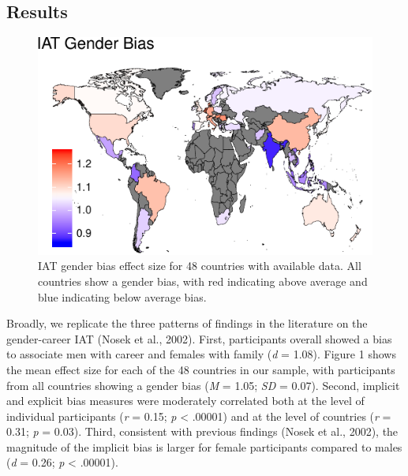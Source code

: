 \documentclass[10pt, letterpaper]{article}
\newenvironment{CodeChunk}{}{}
\begin{document}
\subsection{Results}\label{results}

\begin{CodeChunk}
\begin{figure}[t]

{\centering \includegraphics{figs/map-1} 

}

\caption[IAT gender bias effect size for 48 countries with available data]{IAT gender bias effect size for 48 countries with available data. All countries show a gender bias, with red indicating above average and blue indicating below average bias.}\label{fig:map}
\end{figure}
\end{CodeChunk}

Broadly, we replicate the three patterns of findings in the literature
on the gender-career IAT (Nosek et al., 2002). First, participants
overall showed a bias to associate men with career and females with
family (\emph{d} = 1.08). Figure 1 shows the mean effect size for each
of the 48 countries in our sample, with participants from all countries
showing a gender bias (\emph{M} = 1.05; \emph{SD} = 0.07). Second,
implicit and explicit bias measures were moderately correlated both at
the level of individual participants (\emph{r} = 0.15; \emph{p}
\textless{} .00001) and at the level of countries (\emph{r} = 0.31;
\emph{p} = 0.03). Third, consistent with previous findings (Nosek et
al., 2002), the magnitude of the implicit bias is larger for female
participants compared to males (\emph{d} = 0.26; \emph{p} \textless{}
.00001).
\end{document}
